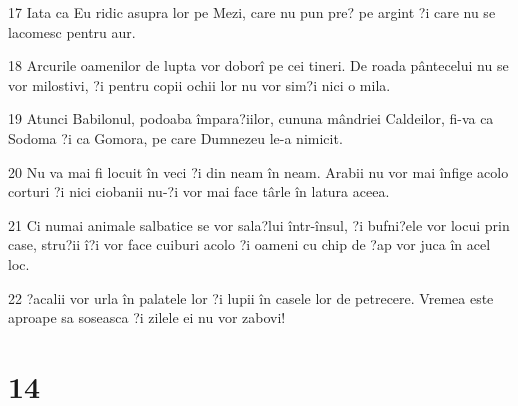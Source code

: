\par 17 Iata ca Eu ridic asupra lor pe Mezi, care nu pun pre? pe argint ?i care nu se lacomesc pentru aur.
\par 18 Arcurile oamenilor de lupta vor doborî pe cei tineri. De roada pântecelui nu se vor milostivi, ?i pentru copii ochii lor nu vor sim?i nici o mila.
\par 19 Atunci Babilonul, podoaba împara?iilor, cununa mândriei Caldeilor, fi-va ca Sodoma ?i ca Gomora, pe care Dumnezeu le-a nimicit.
\par 20 Nu va mai fi locuit în veci ?i din neam în neam. Arabii nu vor mai înfige acolo corturi ?i nici ciobanii nu-?i vor mai face târle în latura aceea.
\par 21 Ci numai animale salbatice se vor sala?lui într-însul, ?i bufni?ele vor locui prin case, stru?ii î?i vor face cuiburi acolo ?i oameni cu chip de ?ap vor juca în acel loc.
\par 22 ?acalii vor urla în palatele lor ?i lupii în casele lor de petrecere. Vremea este aproape sa soseasca ?i zilele ei nu vor zabovi!

\chapter{14}

